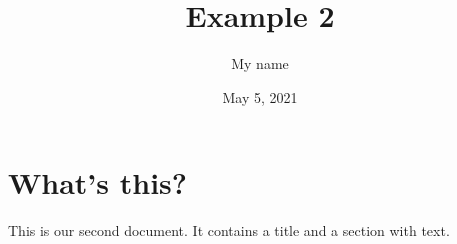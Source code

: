 \documentclass[a4paper,11pt]{article}
\title{Example 2}
\author{My name}
\date{May 5, 2021}
\begin{document}
\maketitle

\section{What's this?}
This is our second document. It contains a title and a section with text.
\end{document}

